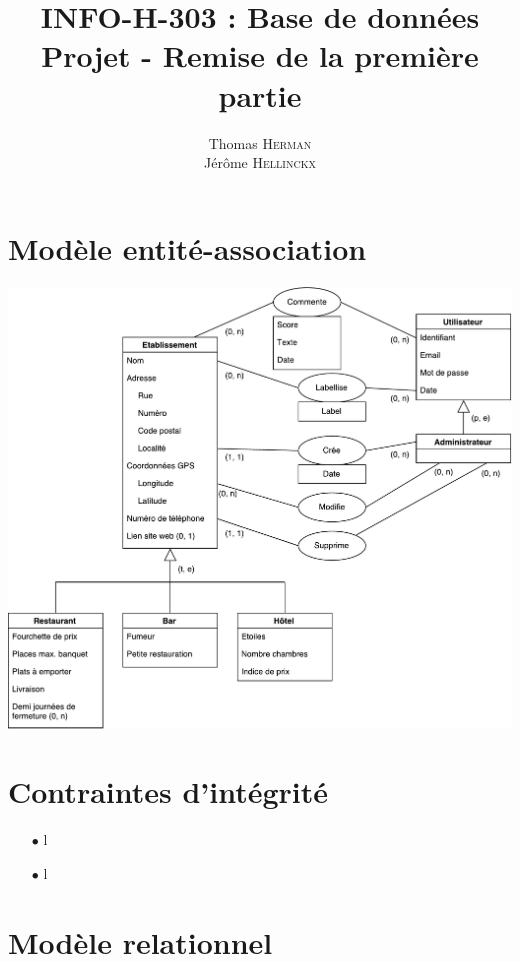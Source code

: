 \documentclass[a4paper, 11pt]{article}
\title{{INFO-H-303 : Base de données} \\ Projet - Remise de la première partie}
\author{Thomas \textsc{Herman} \\ Jérôme \textsc{Hellinckx}}
\begin{document}
\maketitle

\section{Modèle entité-association}
\begin{center}
	\includegraphics[scale=0.6]{horecaEAModel}
\end{center}

\section{Contraintes d'intégrité}

\begin{itemize}
	\item[$\bullet$] l
	\item[$\bullet$] l
\end{itemize}

\section{Modèle relationnel}
\end{document}
